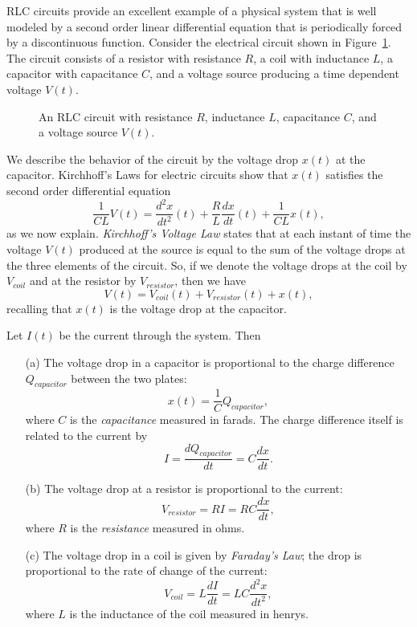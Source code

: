 RLC circuits provide an excellent example of a physical system that is well
modeled by a second order linear differential equation that is periodically 
forced by a discontinuous function.  Consider the electrical circuit shown in 
Figure~\ref{fig:rcl}.  The circuit consists of a resistor with
resistance $R$, a coil with inductance $L$, a 
capacitor with 
capacitance $C$, and a voltage source producing a time 
dependent voltage $V(t)$.    
\begin{figure}[htb]
           \centerline{%
           }
           \caption{An RLC circuit with resistance $R$, inductance $L$,
	   capacitance $C$, and a voltage source $V(t)$.}
           \label{fig:rcl}
\end{figure}

We describe the behavior of the circuit by the voltage drop $x(t)$ at the 
capacitor.  Kirchhoff's Laws 
for electric circuits show that $x(t)$ satisfies 
the second order differential equation
\begin{equation}  \label{e:eleccirc}
\frac{1}{CL}V(t) = \frac{d^2x}{dt^2}(t) + \frac{R}{L}\frac{dx}{dt}(t) + 
\frac{1}{CL}x(t),
\end{equation}
as we now explain.   {\em Kirchhoff's Voltage 
Law\/} states that at each
instant of time the voltage $V(t)$ produced at the source is
equal to the sum of the voltage drops at the three elements of
the circuit.  So, if we denote the voltage drops at the coil
by $V_{coil}$ and at the resistor by $V_{resistor}$, then 
we have 
\begin{equation}  \label{e:kirchhoff}
V(t) = V_{coil}(t) + V_{resistor}(t) + x(t),
\end{equation}
recalling that $x(t)$ is the voltage drop at the capacitor.

Let $I(t)$ be the current through the system.  Then 
\begin{itemize}
\item[(a)]  The voltage drop in a capacitor is proportional to the charge 
difference $Q_{capacitor}$ between the two plates:
\[
x(t) = \frac{1}{C}Q_{capacitor},
\]
where $C$ is the {\em capacitance\/} measured in farads.  The charge 
difference itself is related to the current by 
\[
I = \frac{dQ_{capacitor}}{dt} = C\frac{dx}{dt}.
\]
\item[(b)]  The voltage drop at a resistor is proportional to the current:	
\[
V_{resistor} = RI = RC\frac{dx}{dt},
\]
where $R$ is the {\em resistance\/} measured in ohms.
\item[(c)]  The voltage drop in a coil is given by 
{\em Faraday's Law}; 
the drop is proportional to the rate of change of the current:
\[
V_{coil} = L\frac{dI}{dt} = LC\frac{d^2x}{dt^2},
\]
where $L$ is the inductance of the coil measured in henrys.
\end{itemize}

